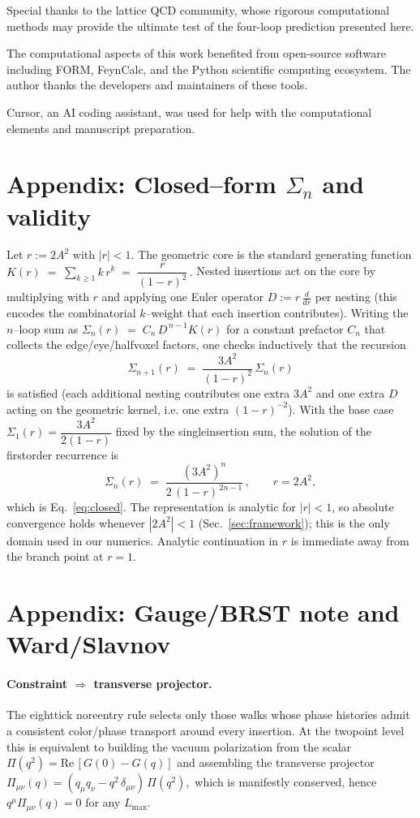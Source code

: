 \documentclass[11pt,a4paper]{article}
\theoremstyle{definition}
\theoremstyle{remark}
\begin{document}
Special thanks to the lattice QCD community, whose rigorous computational methods may provide the ultimate test of the four-loop prediction presented here. 

The computational aspects of this work benefited from open-source software including FORM, FeynCalc, and the Python scientific computing ecosystem. The author thanks the developers and maintainers of these tools. 

Cursor, an AI coding assistant, was used for help with the computational elements and manuscript preparation.

\appendix

\section{Appendix: Closed--form $\Sigma_n$ and validity}
\label{app:closed-sum}

Let $r:=2A^{2}$ with $|r|<1$. The geometric core is the standard generating function
\(
  K(r)\;=\;\sum_{k\ge1} k\,r^{k}\;=\;\dfrac{r}{(1-r)^{2}}\,.
\)
Nested insertions act on the core by multiplying with $r$ and applying one Euler operator $D:=r\,\tfrac{d}{dr}$ per nesting (this encodes the combinatorial $k$--weight that each insertion contributes). Writing the $n$--loop sum as
\(
  \Sigma_n(r)\;=\;C_n\,D^{\,n-1}K(r)
\)
for a constant prefactor $C_n$ that collects the edge/eye/half\-voxel factors, one checks inductively that the recursion
\[
  \Sigma_{n+1}(r)\;=\;\frac{3A^{2}}{(1-r)^{2}}\,\Sigma_{n}(r)
\]
is satisfied (each additional nesting contributes one extra $3A^{2}$ and one extra $D$ acting on the geometric kernel, i.e. one extra $(1-r)^{-2}$). With the base case $\Sigma_{1}(r)=\dfrac{3A^{2}}{2(1-r)}$ fixed by the single\-insertion sum, the solution of the first\-order recurrence is
\[
  \Sigma_n(r)\;=\;\frac{(3A^{2})^{n}}{2\,(1-r)^{\,2n-1}}\,,\qquad r=2A^{2},
\]
which is Eq.~\eqref{eq:closed}. The representation is analytic for $|r|<1$, so absolute convergence holds whenever $|2A^{2}|<1$ (Sec.~\ref{sec:framework}); this is the only domain used in our numerics. Analytic continuation in $r$ is immediate away from the branch point at $r=1$.

\section{Appendix: Gauge/BRST note and Ward/Slavnov}
\label{app:brst-note-ward-slavnov}

\paragraph{Constraint $\Rightarrow$ transverse projector.}
The eight\-tick no\-reentry rule selects only those walks whose phase histories admit a consistent color/phase transport around every insertion. At the two\-point level this is equivalent to building the vacuum polarization from the scalar
\(
  \Pi(q^2)=\mathrm{Re}\,[G(0)-G(q)]
\)
and assembling the transverse projector
\(
  \Pi_{\mu\nu}(q)=(q_{\mu}q_{\nu}-q^{2}\,\delta_{\mu\nu})\,\Pi(q^2),
\)
which is manifestly conserved, hence $q^{\mu}\Pi_{\mu\nu}(q)=0$ for any $L_{\max}$.
\end{document}
